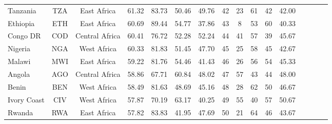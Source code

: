 \begin{longtable}[H]{lccccccccccccccc}
Tanzania      & TZA           & East Africa        & 61.32       & 83.73            & 50.46                     & 49.76           & 42             & 23                  & 61                           & 42                 & 42.00                  \\
Ethiopia                          & ETH           & East Africa        & 60.69       & 89.44            & 54.77                     & 37.86           & 43             & 8                   & 53                           & 60                 & 40.33                  \\
Congo DR & COD           & Central Africa     & 60.41       & 76.72            & 52.28                     & 52.24           & 44             & 41                  & 57                           & 39                 & 45.67                  \\
Nigeria                           & NGA           & West Africa        & 60.33       & 81.83            & 51.45                     & 47.70           & 45             & 25                  & 58                           & 45                 & 42.67                  \\
Malawi                            & MWI           & East Africa        & 59.22       & 81.76            & 54.46                     & 41.43           & 46             & 26                  & 56                           & 54                 & 45.33                  \\
Angola                            & AGO           & Central Africa     & 58.86       & 67.71            & 60.84                     & 48.02           & 47             & 57                  & 43                           & 44                 & 48.00                  \\
Benin                             & BEN           & West Africa        & 58.49       & 81.63            & 48.69                     & 45.16           & 48             & 28                  & 62                           & 50                 & 46.67                  \\
Ivory Coast                     & CIV           & West Africa        & 57.87       & 70.19            & 63.17                     & 40.25           & 49             & 55                  & 40                           & 57                 & 50.67                  \\
Rwanda                            & RWA           & East Africa        & 57.82       & 83.83            & 41.95                     & 47.69           & 50             & 21                  & 64                           & 46                 & 43.67                  \\

\end{longtable}
